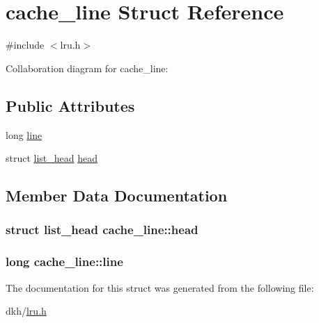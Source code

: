 \hypertarget{structcache__line}{\section{cache\+\_\+line Struct Reference}
\label{structcache__line}
}


{\ttfamily \#include $<$lru.\+h$>$}



Collaboration diagram for cache\+\_\+line\+:
\subsection*{Public Attributes}
\begin{DoxyCompactItemize}
\item 
long \hyperlink{structcache__line_a22870a00436e7425597606393d81eb2c}{line}
\item 
struct \hyperlink{structlist__head}{list\+\_\+head} \hyperlink{structcache__line_af231d538713478b74fc7811adc00545b}{head}
\end{DoxyCompactItemize}


\subsection{Member Data Documentation}
\hypertarget{structcache__line_af231d538713478b74fc7811adc00545b}{
\subsubsection[{head}]{\setlength{\rightskip}{0pt plus 5cm}struct {\bf list\+\_\+head} cache\+\_\+line\+::head}}\label{structcache__line_af231d538713478b74fc7811adc00545b}
\hypertarget{structcache__line_a22870a00436e7425597606393d81eb2c}{
\subsubsection[{line}]{\setlength{\rightskip}{0pt plus 5cm}long cache\+\_\+line\+::line}}\label{structcache__line_a22870a00436e7425597606393d81eb2c}


The documentation for this struct was generated from the following file\+:\begin{DoxyCompactItemize}
\item 
dkh/\hyperlink{lru_8h}{lru.\+h}\end{DoxyCompactItemize}
